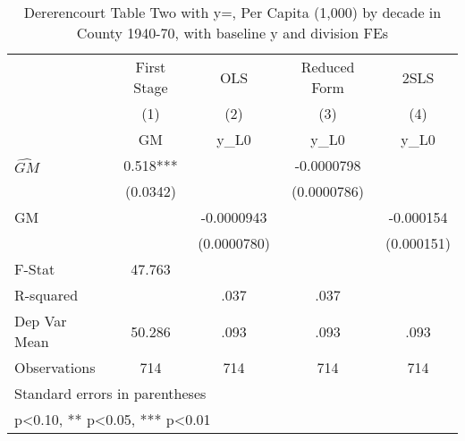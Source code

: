 \begin{table}[htbp]\centering
\def\sym#1{\ifmmode^{#1}\else\(^{#1}\)\fi}
\caption{Dererencourt Table Two with y=, Per Capita (1,000) by decade in County 1940-70, with baseline y and division FEs}
\begin{tabular}{l*{4}{c}}
\toprule
                    & First Stage   &         OLS   &Reduced Form   &        2SLS   \\
                    &\multicolumn{1}{c}{(1)}&\multicolumn{1}{c}{(2)}&\multicolumn{1}{c}{(3)}&\multicolumn{1}{c}{(4)}\\
                    &\multicolumn{1}{c}{GM}&\multicolumn{1}{c}{y\_L0}&\multicolumn{1}{c}{y\_L0}&\multicolumn{1}{c}{y\_L0}\\
\midrule
$\hat{GM}$          &       0.518***&               &  -0.0000798   &               \\
                    &    (0.0342)   &               & (0.0000786)   &               \\
\addlinespace
GM                  &               &  -0.0000943   &               &   -0.000154   \\
                    &               & (0.0000780)   &               &  (0.000151)   \\
\midrule
F-Stat              &      47.763   &               &               &               \\
R-squared           &               &        .037   &        .037   &               \\
Dep Var Mean        &      50.286   &        .093   &        .093   &        .093   \\
Observations        &         714   &         714   &         714   &         714   \\
\bottomrule
\multicolumn{5}{l}{\footnotesize Standard errors in parentheses}\\
\multicolumn{5}{l}{\footnotesize * p<0.10, ** p<0.05, *** p<0.01}\\
\end{tabular}
\end{table}
